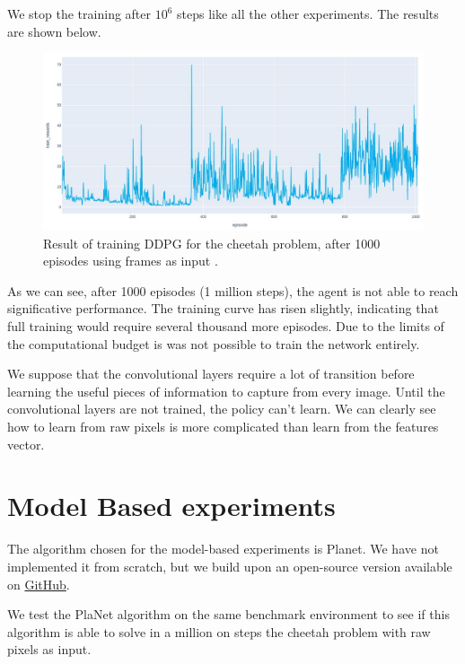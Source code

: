 We stop the training after $10^6$ steps like all the other experiments. The results are shown below.

\begin{figure}[H]
\centering
\includegraphics[width=1.\textwidth, height=.4\textheight]{pictures/ddpg_train_reward_with_frames_2}
\caption{ Result of training DDPG for the cheetah problem, after 1000 episodes using frames as input .}
\end{figure}

As we can see, after 1000 episodes (1 million steps), the agent is not able to reach significative performance. 
The training curve has risen slightly, indicating that full training would require several thousand more episodes.
Due to the limits of the computational budget is was not possible to train the network entirely.

We suppose that the convolutional layers require a lot of transition before learning the useful pieces of information to capture from every image.
Until the convolutional layers are not trained, the policy can't learn.
We can clearly see how to learn from raw pixels is more complicated than learn from the features vector. 



\section{Model Based experiments }
The algorithm chosen for the model-based experiments is Planet.
We have not implemented it from scratch, but we build upon an open-source version available on \href{https://github.com/Kaixhin/PlaNet}{GitHub}.

We test the PlaNet algorithm on the same benchmark environment to see if this algorithm is able to solve in a million on steps the cheetah problem with raw pixels as input.

